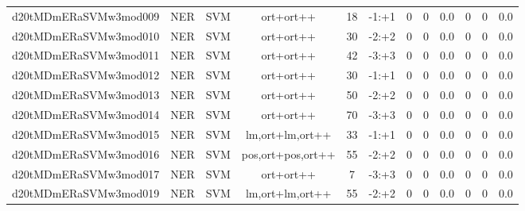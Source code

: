 \documentclass[a4paper]{article}
\begin{document}
\begin{landscape}
\begin{center}
\begin{tabular}{ |c|c|c|c|c|c|c|c|c|c|c|c|}
 
 	
 	\small{ d20tMDmERaSVMw3mod009 } & \small{ NER} & \small{  SVM }  & ort+ort++  &  18 &  \small{  -1:+1 }  &  0 & 0 & 0.0  &  0 & 0 & 0.0 \\
 	

 
 	
 	\small{ d20tMDmERaSVMw3mod010 } & \small{ NER} & \small{  SVM }  & ort+ort++  &  30 &  \small{  -2:+2 }  &  0 & 0 & 0.0  &  0 & 0 & 0.0 \\
 	

 
 	
 	\small{ d20tMDmERaSVMw3mod011 } & \small{ NER} & \small{  SVM }  & ort+ort++  &  42 &  \small{  -3:+3 }  &  0 & 0 & 0.0  &  0 & 0 & 0.0 \\
 	

 
 	
 	\small{ d20tMDmERaSVMw3mod012 } & \small{ NER} & \small{  SVM }  & ort+ort++  &  30 &  \small{  -1:+1 }  &  0 & 0 & 0.0  &  0 & 0 & 0.0 \\
 	

 
 	
 	\small{ d20tMDmERaSVMw3mod013 } & \small{ NER} & \small{  SVM }  & ort+ort++  &  50 &  \small{  -2:+2 }  &  0 & 0 & 0.0  &  0 & 0 & 0.0 \\
 	

 
 	
 	\small{ d20tMDmERaSVMw3mod014 } & \small{ NER} & \small{  SVM }  & ort+ort++  &  70 &  \small{  -3:+3 }  &  0 & 0 & 0.0  &  0 & 0 & 0.0 \\
 	

 
 	
 	\small{ d20tMDmERaSVMw3mod015 } & \small{ NER} & \small{  SVM }  & lm,ort+lm,ort++  &  33 &  \small{  -1:+1 }  &  0 & 0 & 0.0  &  0 & 0 & 0.0 \\
 	

 
 	
 	\small{ d20tMDmERaSVMw3mod016 } & \small{ NER} & \small{  SVM }  & pos,ort+pos,ort++  &  55 &  \small{  -2:+2 }  &  0 & 0 & 0.0  &  0 & 0 & 0.0 \\
 	

 
 	
 	\small{ d20tMDmERaSVMw3mod017 } & \small{ NER} & \small{  SVM }  & ort+ort++  &  7 &  \small{  -3:+3 }  &  0 & 0 & 0.0  &  0 & 0 & 0.0 \\
 	

 
 	
 	\small{ d20tMDmERaSVMw3mod019 } & \small{ NER} & \small{  SVM }  & lm,ort+lm,ort++  &  55 &  \small{  -2:+2 }  &  0 & 0 & 0.0  &  0 & 0 & 0.0 \\
 	


\end{tabular}
\end{center}
\end{landscape}
\end{document}
